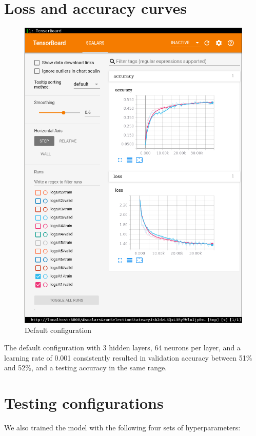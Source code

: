 \documentclass[11pt]{article}
\begin{document}


\section*{Loss and accuracy curves}
\begin{figure}[H]
	\centering
	\includegraphics[width=0.6 \textwidth]{figure/t1.png}
	\caption{Default configuration}
	\label{fig:t1}
\end{figure}
The default configuration with 3 hidden layers, 64 neurons per layer, and a learning rate of 0.001 consistently resulted in validation accuracy between 51\% and 52\%, and a testing accuracy in the same range.


\section*{Testing configurations}
We also trained the model with the following four sets of hyperparameters:
\end{document}
